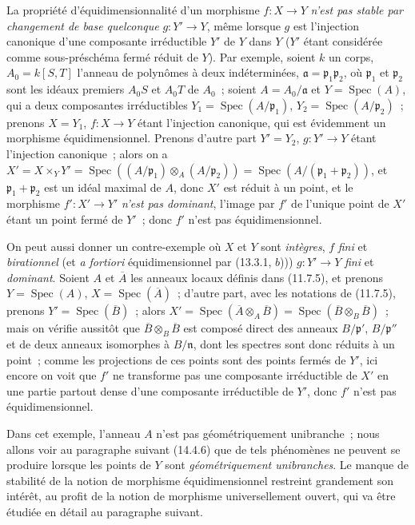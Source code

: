 \begin{remark}[13.3.9]
La propriété d'équidimensionnalité d'un morphisme $f:X\to Y$ \emph{n'est pas
stable par changement de base quelconque} $g:Y'\to Y$, même lorsque $g$ est
l'injection canonique d'une composante irréductible $Y'$ de $Y$ dans $Y$
($Y'$ étant
considérée comme sous-préschéma fermé réduit de $Y$). Par exemple, soient $k$
un corps, $A_0=k[S,T]$ l'anneau de polynômes à deux indéterminées,
$\mathfrak a=\mathfrak p_1\mathfrak p_2$, où $\mathfrak p_1$ et
$\mathfrak p_2$ sont les idéaux premiers $A_0S$ et $A_0T$ de $A_0$~; soient
$A=A_0/\mathfrak a$ et $Y=\operatorname{Spec}(A)$, qui a deux composantes
irréductibles $Y_1=\operatorname{Spec}(A/\mathfrak p_1)$,
$Y_2=\operatorname{Spec}(A/\mathfrak p_2)$~; prenons $X=Y_1$,
$f:X\to Y$ étant l'injection canonique, qui est évidemment un morphisme
équidimensionnel. Prenons d'autre part $Y'=Y_2$, $g:Y'\to Y$ étant l'injection
canonique~; alors on a
$X'=X\times_Y Y'=\operatorname{Spec}((A/\mathfrak p_1)\otimes_A
(A/\mathfrak p_2))=\operatorname{Spec}(A/(\mathfrak p_1+\mathfrak p_2))$,
et $\mathfrak p_1+\mathfrak p_2$ est un idéal maximal de $A$, donc $X'$ est
réduit à un point, et le morphisme $f':X'\to Y'$ \emph{n'est pas dominant},
l'image par $f'$ de l'unique point de $X'$ étant un point fermé de $Y'$~;
donc $f'$ n'est pas équidimensionnel.

On peut aussi donner un contre-exemple où $X$ et $Y$ sont \emph{intègres}, $f$
\emph{fini} et \emph{birationnel} (et \emph{a fortiori} équidimensionnel par
(13.3.1, $b$))) $g:Y'\to Y$ \emph{fini} et \emph{dominant}. Soient $A$ et
$\overline A$ les anneaux locaux définis dans (11.7.5), et prenons
$Y=\operatorname{Spec}(A)$, $X=\operatorname{Spec}(\overline A)$~; d'autre
part, avec les notations de (11.7.5), prenons
$Y'=\operatorname{Spec}(\overline B)$~; alors
$X'=\operatorname{Spec}(\overline A\otimes_A\overline B)
=\operatorname{Spec}(\overline B\otimes_B\overline B)$~; mais on vérifie
aussitôt que $\overline B\otimes_B\overline B$ est composé direct des anneaux
$B/\mathfrak p'$, $B/\mathfrak p''$ et de deux anneaux isomorphes à
$B/\mathfrak n$, dont les spectres sont donc réduits à un point~; comme les
projections de ces points sont des points fermés de $Y'$, ici encore on voit
que $f'$ ne transforme pas une composante irréductible de $X'$ en une partie
partout dense d'une composante irréductible de $Y'$, donc $f'$ n'est pas
équidimensionnel.

Dans cet exemple, l'anneau $A$ n'est pas géométriquement unibranche~; nous
allons voir au paragraphe suivant (14.4.6) que de tels phénomènes ne peuvent se
produire lorsque les points de $Y$ sont \emph{géométriquement unibranches}. Le
manque de stabilité de la notion de morphisme équidimensionnel restreint
grandement son intérêt, au profit de la notion de morphisme universellement
ouvert, qui va être étudiée en détail au paragraphe suivant.
\end{remark}

